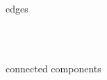 \documentclass[12pt,a4paper,oneside,openright]{book}
\begin{document}
\begin{CJK}{UTF8}{}
\begin{figure}[htbp]
\begin{center}
\begin{minipage}[t]{.32\textwidth}
      \begin{center}
        \\
        edges
      \end{center}
    \end{minipage}\medskip\\
    \begin{minipage}[t]{.32\textwidth}
      \begin{center}
        \\
        connected components
      \end{center}
    \end{minipage}

\end{center}
\end{figure}
\end{CJK}
\end{document}

